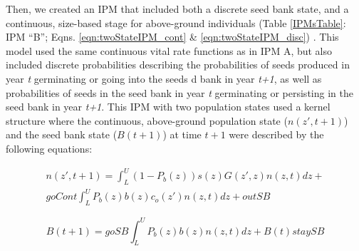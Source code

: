 \documentclass[12pt, letterpaper]{article}
\begin{document}
Then, we created an IPM that included both a discrete seed bank state, and a continuous, size-based stage for above-ground individuals (Table \ref{IPMsTable}: IPM “B”; Eqns. \ref{eqn:twoStateIPM_cont} \& \ref{eqn:twoStateIPM_disc}) \cite{Ellner2006IntegralDemography, Rees2006, Paniw2017}. This model used the same continuous vital rate functions as in IPM A, but also included discrete probabilities describing the probabilities of seeds produced in year \textit{t} germinating or going into the seeds d bank in year \textit{t+1}, as well as probabilities of seeds in the seed bank in year \textit{t} germinating or persisting in the seed bank in year \textit{t+1}. This IPM with two population states used a kernel structure where the continuous, above-ground population state ($n(z',t+1)$) and the seed bank state ($B(t+1)$) at time $t+1$ were described by the following equations: 

\begin{equation}
\label{eqn:twoStateIPM_cont}
\begin{split}
n(z', t+1) = \int_{L}^{U}(1-P_b(z))s(z)G(z',z)n(z,t)dz + \\ goCont\int_{L}^{U}P_b(z)b(z)c_o(z')n(z,t)dz + outSB 
\end{split}
\end{equation}

\begin{equation}\label{eqn:twoStateIPM_disc}
     B(t+1) = goSB\int_{L}^{U}P_b(z)b(z)n(z,t)dz + B(t)staySB 
\end{equation}

\small
\end{document}
